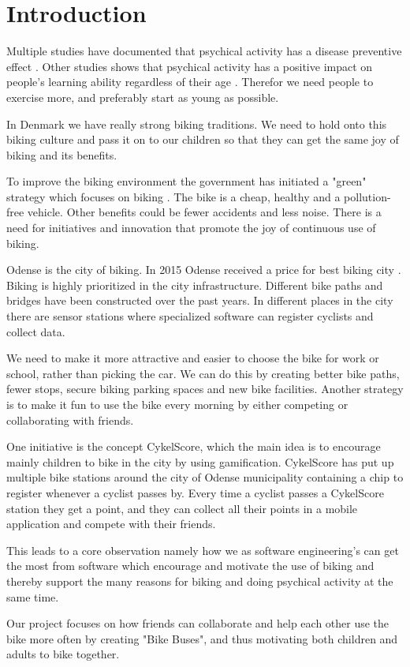 \section{Introduction}


Multiple studies have documented that psychical activity has a disease preventive effect \cite{jensen2007cykling}. Other studies shows that psychical activity has a positive impact on people's learning ability regardless of their age \cite{fysiskAktivitet}. Therefor we need people to exercise more, and preferably start as young as possible.

In Denmark we have really strong biking traditions. We need to hold onto this biking culture and pass it on to our children so that they can get the same joy of biking and its benefits. 

To improve the biking environment the government has initiated a "green" strategy which focuses on biking \cite{DanmarkOpPaaCyklen}. The bike is a cheap, healthy and a pollution-free vehicle. Other benefits could be fewer accidents and less noise. There is a need for initiatives and innovation that promote the joy of continuous use of biking.

Odense is the city of biking. In 2015 Odense received a price for best biking city \cite{OdenseCycleCity2015}. Biking is highly prioritized in the city infrastructure. Different bike paths and bridges have been constructed over the past years. In different places in the city there are sensor stations where specialized software can register cyclists and collect data. 

We need to make it more attractive and easier to choose the bike for work or school, rather than picking the car. We can do this by creating better bike paths, fewer stops, secure biking parking spaces and new bike facilities. Another strategy is to make it fun to use the bike every morning by either competing or collaborating with friends.

One initiative is the concept CykelScore, which the main idea is to encourage mainly children to bike in the city by using gamification. CykelScore has put up multiple bike stations around the city of Odense municipality containing a chip to register whenever a cyclist passes by. Every time a cyclist passes a CykelScore station they get a point, and they can collect all their points in a mobile application and compete with their friends.

This leads to a core observation namely how we as software engineering's can get the most from software which encourage and motivate the use of biking and thereby support the many reasons for biking and doing psychical activity at the same time. 

Our project focuses on how friends can collaborate and help each other use the bike more often by creating "Bike Buses", and thus motivating both children and adults to bike together.
